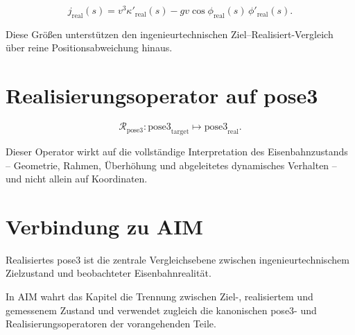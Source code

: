 \begin{definition}
\label{def:realized-jerk}
\[
j_{\mathrm{real}}(s)
=
v^3\kappa'_{\mathrm{real}}(s)-gv\cos\phi_{\mathrm{real}}(s)\,\phi'_{\mathrm{real}}(s).
\]
\end{definition}

Diese Größen unterstützen den ingenieurtechnischen Ziel--Realisiert-Vergleich
über reine Positionsabweichung hinaus.

\section{Realisierungsoperator auf pose3}

\begin{definition}
\label{def:pose3-realization-operator}
\[
\mathcal R_{\mathrm{pose3}}:
\mathrm{pose3}_{\mathrm{target}}
\mapsto
\mathrm{pose3}_{\mathrm{real}}.
\]
\end{definition}

Dieser Operator wirkt auf die vollständige Interpretation des
Eisenbahnzustands -- Geometrie, Rahmen, Überhöhung und abgeleitetes dynamisches
Verhalten -- und nicht allein auf Koordinaten.

\section{Verbindung zu AIM}

\begin{summary}
Realisiertes pose3 ist die zentrale Vergleichsebene zwischen
ingenieurtechnischem Zielzustand und beobachteter Eisenbahnrealität.

In AIM wahrt das Kapitel die Trennung zwischen Ziel-, realisiertem und
gemessenem Zustand und verwendet zugleich die kanonischen pose3- und
Realisierungsoperatoren der vorangehenden Teile.
\end{summary}
